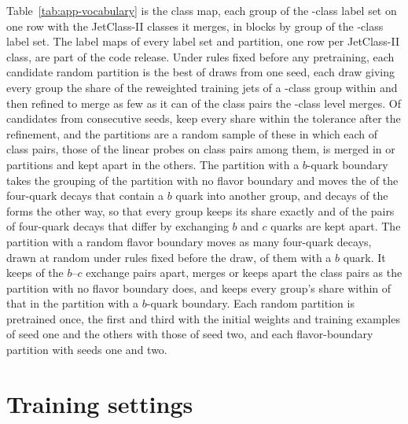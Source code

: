 Table~\ref{tab:app-vocabulary} is the class map, each group of the \Kmid-class label set on one row with the
JetClass-II classes it merges, in blocks by group of the \Kcoarse-class label set. The label maps of every
label set and partition, one row per JetClass-II class, are part of the code release. Under rules fixed before
any pretraining, each candidate random partition is the best of \RandVtwoTrials{} draws from one seed, each
draw giving every group the share of the reweighted training jets of a \Kcoarse-class group within
\RandVtwoShareTol{} and then refined to merge as few as it can of the class pairs the \Kcoarse-class level
merges. Of \RandVtwoPoolDraws{} candidates from consecutive seeds, \RandVtwoPoolPass{} keep every share within
the tolerance after the refinement, and the \RandVtwoNPartitions{} partitions are a random sample of these in
which each of \RandVtwoNPairs{} class pairs, those of the linear probes on class pairs among them, is merged in
\RandVtwoMergedMin{} or \RandVtwoMergedMax{} partitions and kept apart in the others. The partition with a
$b$-quark boundary takes the grouping of the partition with no flavor boundary and moves the
\RandFlavCutClasses{} of the \RandFlavSplitOrbitClasses{} four-quark decays \RandFlavSplitOrbit{} that contain a
$b$ quark into another group, and \RandFlavOrbitClassesMoved{} decays of the forms \RandFlavOrbitsMovedList{}
the other way, so that every group keeps its share exactly and \RandFlavFoneBcSplit{} of the \RandFlavBcPairs{}
pairs of four-quark decays that differ by exchanging $b$ and $c$ quarks are kept apart. The partition with a
random flavor boundary moves as many four-quark decays, drawn at random under rules fixed before the draw,
\RandFlavFonerCutWithB{} of them with a $b$ quark. It keeps \RandFlavFonerBcSplit{} of the $b$--$c$ exchange
pairs apart, merges or keeps apart the \RandVtwoNPairs{} class pairs as the partition with no flavor boundary
does, and keeps every group's share within \RandFlavFonerShareTol{} of that in the partition with a $b$-quark
boundary. Each random partition is pretrained once, the first and third with the initial weights and training
examples of seed one and the others with those of seed two, and each flavor-boundary partition with seeds one
and two.



\section{Training settings}\label{sec:app-settings}

